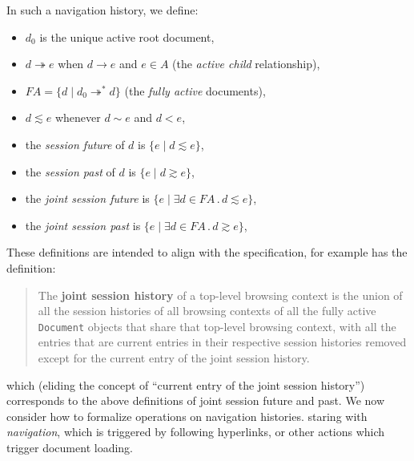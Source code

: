 \documentclass{notes}
\newcommand{\Active}{A}
\newcommand{\FullyActive}{F\!A}
\newcommand{\parentOf}{\rightarrow}
\newcommand{\parentOfActive}{\twoheadrightarrow}
\newcommand{\ltChron}{<}
\newcommand{\eqSess}{\sim}
\newcommand{\ltSess}{\lesssim}
\newcommand{\gtSess}{\gtrsim}
\newcommand{\rootDoc}{d_0}
\newcommand{\aDoc}{d}
\newcommand{\bDoc}{e}
\newcommand{\st}{\mathbin.}
\begin{document}
In such a navigation history, we define:
\begin{itemize}
\item $\rootDoc$ is the unique active root document,
\item $\aDoc \parentOfActive \bDoc$ when $\aDoc \parentOf \bDoc$ and $\bDoc \in \Active$
  (the \emph{active child} relationship),
\item $\FullyActive = \{ \aDoc \mid \rootDoc \parentOfActive^* \aDoc \}$
  (the \emph{fully active} documents),
\item $\aDoc \ltSess \bDoc$ whenever $\aDoc \eqSess \bDoc$ and $\aDoc \ltChron \bDoc$,
\item the \emph{session future} of $\aDoc$ is $\{ \bDoc \mid \aDoc \ltSess \bDoc \}$,
\item the \emph{session past} of $\aDoc$ is $\{ \bDoc \mid \aDoc \gtSess \bDoc \}$,
\item the \emph{joint session future} is $\{ \bDoc \mid \exists \aDoc \in \FullyActive \st \aDoc \ltSess \bDoc \}$,
\item the \emph{joint session past} is $\{ \bDoc \mid \exists \aDoc \in \FullyActive \st \aDoc \gtSess \bDoc \}$,
\end{itemize}
These definitions are intended to align with the specification, for example
\cite[7.7.2]{whatwg} has the definition:
\begin{quote}
  The \textbf{joint session history} of a top-level browsing context is the
  union of all the session histories of all browsing contexts of all
  the fully active \verb|Document| objects that share that top-level browsing
  context, with all the entries that are current entries in their
  respective session histories removed except for the current entry of
  the joint session history.
\end{quote}
which (eliding the concept of ``current entry of the joint session history'')
corresponds to the above definitions of joint session future and past.
%
We now consider how to formalize operations on navigation histories.
staring with \emph{navigation}, which is triggered by following hyperlinks,
or other actions which trigger document loading.
\end{document}
